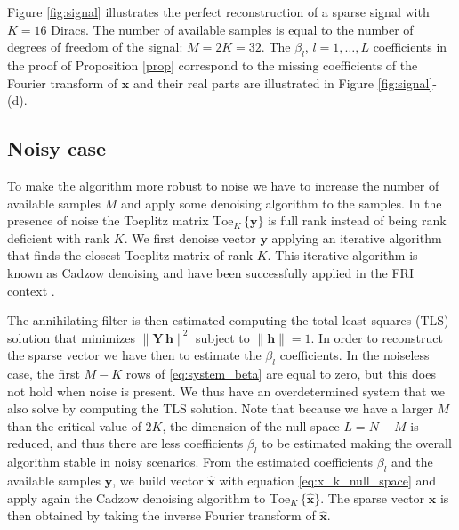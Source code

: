 \documentclass{article}
\def\x{{\bm x}}
\def\bhx{\bm{\hat{x}}}
\def\y{{\bm y}}
\providecommand{\norm}[1]{\lVert#1\rVert}
\providecommand{\toe}[2]{\text{Toe}_{#2}\,\lbrace#1\rbrace}
\begin{document}
Figure \ref{fig:signal} illustrates the perfect reconstruction of a sparse signal with $K=16$
Diracs. The number of available samples is equal to the number of degrees of freedom of the 
signal: $M=2K=32$. 
The $\beta_l$, $l=1,\ldots,L$ coefficients in the proof of Proposition \eqref{prop} 
correspond to the missing coefficients of the Fourier transform of $\x$ and their real parts
are illustrated in Figure \ref{fig:signal}-(d).


\subsection{Noisy case}

To make the algorithm more robust to noise we have to increase the number of available samples $M$
and apply some denoising algorithm to the samples.
In the presence of noise the Toeplitz matrix $\toe{\y}{K}$ is full rank instead of being rank 
deficient with rank $K$. We first denoise 
vector $\y$ applying an iterative algorithm that finds the closest Toeplitz matrix of rank $K$.
This iterative algorithm is known as Cadzow denoising \cite{cadzow1988} and have been successfully
applied in the FRI context \cite{blu2008}.


The annihilating filter is then estimated computing the total least squares (TLS) solution that
minimizes $\norm{\bm{Y}\,\bm{h}}^2$ subject to $\norm{\bm{h}}=1$. In order to reconstruct the sparse vector we
have then to estimate the $\beta_l$ coefficients.
In the noiseless case, the first $M-K$ rows of \eqref{eq:system_beta} are equal to zero, but this 
does not hold when noise is present. We thus have an overdetermined system that we also solve
by computing the TLS solution.
Note that because we have a larger $M$ than the critical value of $2K$, the dimension of the null
space $L=N-M$ is reduced, and thus there are less coefficients $\beta_l$ to be estimated making the 
overall algorithm stable in noisy scenarios.
From the estimated coefficients $\beta_l$ and the available samples $\y$, we build vector $\bhx$ 
with equation \eqref{eq:x_k_null_space}
and apply again the Cadzow denoising algorithm to $\toe{\bhx}{K}$. The sparse vector $\x$ is then obtained
by taking the inverse Fourier transform of $\bhx$.
\end{document}

